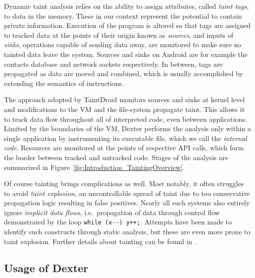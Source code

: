 \documentclass[12pt,twoside,notitlepage]{report}
\begin{document}
Dynamic taint analysis relies on the ability to assign attributes, called \emph{taint tags}, to data in the memory. These in our context represent the potential to contain private information. Execution of the program is altered so that tags are assigned to tracked data at the points of their origin known as \emph{sources}, and inputs of \emph{sinks}, operations capable of sending data away, are monitored to make sure no tainted data leave the system. Sources and sinks on Android are for example the contacts database and network sockets respectively. In between, tags are propagated as data are moved and combined, which is usually accomplished by extending the semantics of instructions.

The approach adopted by TaintDroid monitors sources and sinks at kernel level and modifications to the VM and the file-system propagate taint. This allows it to track data flow throughout all of interpreted code, even between applications. Limited by the boundaries of the VM, Dexter performs the analysis only within a single application by instrumenting its executable file, which we call the \emph{internal code}. Resources are monitored at the points of respective API calls, which form the border between tracked and untracked code. Stages of the analysis are summarized in Figure~\ref{fig:Introduction_TaintingOverview}. 

Of course tainting brings complications as well. Most notably, it often struggles to avoid \emph{taint explosion}, an uncontrollable spread of taint due to too conservative propagation logic resulting in false positives. Nearly all such systems also entirely ignore \emph{implicit data flows}, i.e.\ propagation of data through control flow demonstrated by the loop \verb$while (x--) y++;$. Attempts have been made to identify such constructs through static analysis\cite{Nair:2008:VMB:1346355.1346524}, but these are even more prone to taint explosion. Further details about tainting can be found in \cite{Schwartz:2010:YEW:1849417.1849981, Ermolinskiy:EECS-2010-92}.

\subsection{Usage of Dexter}

\end{document}
